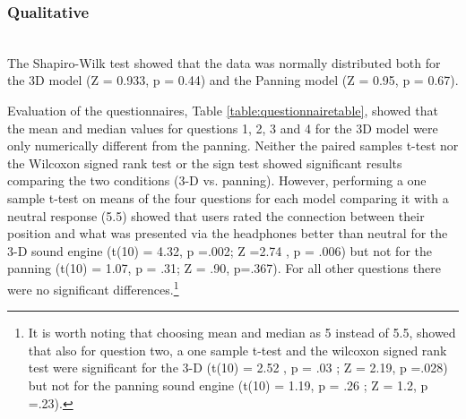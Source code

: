 \documentclass[journal]{IEEEtran}
\begin{document}
\subsubsection{Qualitative}~\\
The Shapiro-Wilk test showed that the data was normally distributed both for the 3D model (Z = 0.933, p = 0.44) and the Panning model (Z = 0.95, p = 0.67). 

Evaluation of the questionnaires, Table \ref{table:questionnairetable}, showed that the mean and median values for questions 1, 2, 3 and 4 for the 3D model were only numerically different from the panning. Neither the paired samples t-test nor the Wilcoxon signed rank test or the sign test showed significant results comparing the two conditions (3-D vs. panning). However, performing a one sample t-test on means of the four questions for each model comparing it with a neutral response (5.5) showed that users rated the connection between their position and what was presented via the headphones better than neutral for the 3-D sound engine (t(10) = 4.32, p =.002; Z =2.74 , p = .006) but not for the panning (t(10) = 1.07, p = .31; Z = .90, p=.367). For all other questions there were no significant differences.\footnote{It is worth noting that choosing mean and median as 5 instead of 5.5, showed that also for question two, a one sample t-test and the wilcoxon signed rank test were significant for the 3-D (t(10) = 2.52 , p = .03 ; Z = 2.19, p =.028) but not for the panning sound engine (t(10) = 1.19, p = .26 ; Z = 1.2, p =.23).}

\begin{table}[h]
  \caption{Questionnaire results}
  \label{table:questionnairetable}
\end{table}
\end{document}
